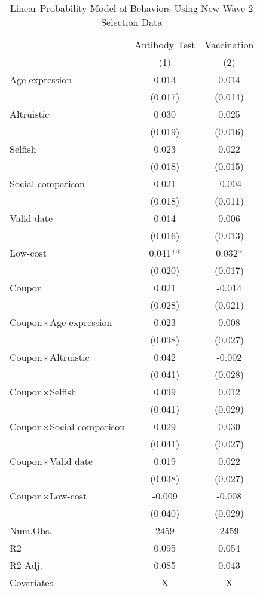 \documentclass[
  11pt,
  a4paper,
]{article}
\begin{document}
\begin{table}

\caption{\label{tab:act2-reg}Linear Probability Model of Behaviors Using New Wave 2 Selection Data}
\centering
\begin{tabular}[t]{lcc}
\toprule
\multicolumn{1}{c}{ } & \multicolumn{1}{c}{Antibody Test} & \multicolumn{1}{c}{Vaccination} \\
\cmidrule(l{3pt}r{3pt}){2-2} \cmidrule(l{3pt}r{3pt}){3-3}
  & (1) & (2)\\
\midrule
Age expression & 0.013 & 0.014\\
 & (0.017) & (0.014)\\
Altruistic & 0.030 & 0.025\\
 & (0.019) & (0.016)\\
Selfish & 0.023 & 0.022\\
 & (0.018) & (0.015)\\
Social comparison & 0.021 & -0.004\\
 & (0.018) & (0.011)\\
Valid date & 0.014 & 0.006\\
 & (0.016) & (0.013)\\
Low-cost & 0.041** & 0.032*\\
 & (0.020) & (0.017)\\
Coupon & 0.021 & -0.014\\
 & (0.028) & (0.021)\\
Coupon×Age expression & 0.023 & 0.008\\
 & (0.038) & \vphantom{1} (0.027)\\
Coupon×Altruistic & 0.042 & -0.002\\
 & (0.041) & (0.028)\\
Coupon×Selfish & 0.039 & 0.012\\
 & (0.041) & (0.029)\\
Coupon×Social comparison & 0.029 & 0.030\\
 & (0.041) & (0.027)\\
Coupon×Valid date & 0.019 & 0.022\\
 & (0.038) & (0.027)\\
Coupon×Low-cost & -0.009 & -0.008\\
 & (0.040) & (0.029)\\
\midrule
Num.Obs. & 2459 & 2459\\
R2 & 0.095 & 0.054\\
R2 Adj. & 0.085 & 0.043\\
Covariates & X & X\\
\bottomrule
\end{tabular}
\end{table}
\end{document}
